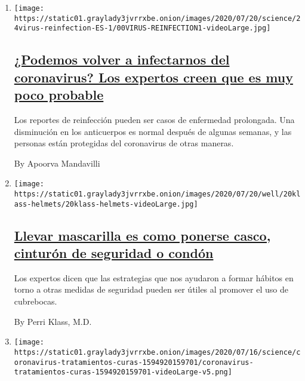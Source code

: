 \begin{enumerate}
\def\labelenumi{\arabic{enumi}.}
\item
  \texttt{[image: https://static01.graylady3jvrrxbe.onion/images/2020/07/20/science/24virus-reinfection-ES-1/00VIRUS-REINFECTION1-videoLarge.jpg]}

  \hypertarget{podemos-volver-a-infectarnos-del-coronavirus-los-expertos-creen-que-es-muy-poco-probable}{%
  \subsection{\texorpdfstring{\href{/es/2020/07/24/espanol/ciencia-y-tecnologia/reinfeccion-coronavirus.html}{¿Podemos
  volver a infectarnos del coronavirus? Los expertos creen que es muy
  poco
  probable}}{¿Podemos volver a infectarnos del coronavirus? Los expertos creen que es muy poco probable}}\label{podemos-volver-a-infectarnos-del-coronavirus-los-expertos-creen-que-es-muy-poco-probable}}

  Los reportes de reinfección pueden ser casos de enfermedad prolongada.
  Una disminución en los anticuerpos es normal después de algunas
  semanas, y las personas están protegidas del coronavirus de otras
  maneras.

  By Apoorva Mandavilli
\item
  \texttt{[image: https://static01.graylady3jvrrxbe.onion/images/2020/07/20/well/20klass-helmets/20klass-helmets-videoLarge.jpg]}

  \hypertarget{llevar-mascarilla-es-como-ponerse-casco-cinturuxf3n-de-seguridad-o-conduxf3n}{%
  \subsection{\texorpdfstring{\href{/es/2020/07/24/espanol/mascarillas-habitos.html}{Llevar
  mascarilla es como ponerse casco, cinturón de seguridad o
  condón}}{Llevar mascarilla es como ponerse casco, cinturón de seguridad o condón}}\label{llevar-mascarilla-es-como-ponerse-casco-cinturuxf3n-de-seguridad-o-conduxf3n}}

  Los expertos dicen que las estrategias que nos ayudaron a formar
  hábitos en torno a otras medidas de seguridad pueden ser útiles al
  promover el uso de cubrebocas.

  By Perri Klass, M.D.
\item
  \texttt{[image: https://static01.graylady3jvrrxbe.onion/images/2020/07/16/science/coronavirus-tratamientos-curas-1594920159701/coronavirus-tratamientos-curas-1594920159701-videoLarge-v5.png]}


\end{enumerate}
